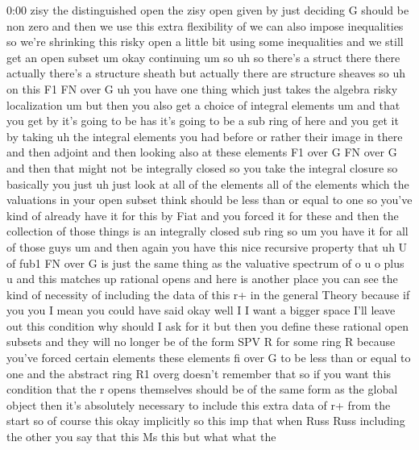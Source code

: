 \begin{unfinished}{0:00}
zisy  the  distinguished  open  the  zisy
open  given  by  just  deciding  G  should  be
non  zero  and  then  we  use  this  extra
flexibility  of  we  can  also  impose
inequalities  so  we're  shrinking  this
risky  open  a  little  bit  using  some
inequalities  and  we  still  get  an  open
subset  um  okay
continuing
um  so  uh  so  there's  a  struct  there  there
actually  there's  a  structure  sheath  but
actually  there  are  structure
sheaves
so  uh  on  this  F1  FN  over  G  uh  you  have
one  thing  which  just  takes  the  algebra
risky
localization  um  but  then  you  also  get  a
choice  of  integral
elements  um  and  that  you  get  by  it's
going  to  be  has  it's  going  to  be  a  sub
ring  of  here  and  you  get  it  by  taking  uh
the  integral  elements  you  had  before  or
rather  their  image  in  there  and  then
adjoint  and  then  looking  also  at  these
elements  F1  over  G  FN  over  G  and  then
that  might  not  be  integrally  closed  so
you  take  the  integral  closure
so  basically  you  just  uh  just  look  at
all  of  the  elements  all  of  the  elements
which  the  valuations  in  your  open  subset
think  should  be  less  than  or  equal  to
one  so  you've  kind  of  already  have  it
for  this  by  Fiat  and  you  forced  it  for
these  and  then  the  collection  of  those
things  is  an  integrally  closed  sub  ring
so  um  you  have  it  for  all  of  those
guys  um  and  then  again  you  have  this
nice  recursive  property  that  uh  U  of
fub1  FN  over  G  is  just  the  same  thing  as
the  valuative  spectrum  of  o  u  o  plus  u
and  this  matches  up  rational
opens  and  here  is  another  place  you  can
see  the  kind  of  necessity  of  including
the  data  of  this  r+  in  the  general
Theory  because  if
you  you  I  mean  you  could  have  said  okay
well  I  I  want  a  bigger  space  I'll  leave
out  this  condition  why  should  I  ask  for
it  but  then  you  define  these  rational
open  subsets  and  they  will  no  longer  be
of  the  form  SPV  R  for  some  ring  R
because  you've  forced  certain  elements
these  elements  fi  over  G  to  be  less  than
or  equal  to  one  and  the  abstract  ring  R1
overg  doesn't  remember  that  so  if  you
want  this  condition  that  the  r  opens
themselves  should  be  of  the  same  form  as
the  global  object  then  it's  absolutely
necessary  to  include  this  extra  data  of
r+  from  the
start  so  of  course
this  okay  implicitly  so  this  imp  that
when  Russ  Russ  including  the  other  you
say  that  this  Ms  this  but  what  what  the

\end{unfinished}
